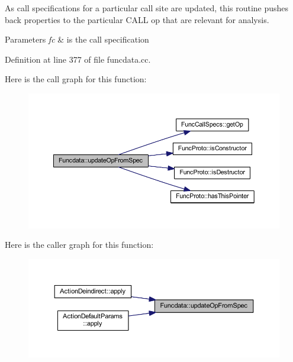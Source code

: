 As call specifications for a particular call site are updated, this routine pushes back properties to the particular C\+A\+LL op that are relevant for analysis. 
\begin{DoxyParams}{Parameters}
{\em fc} & is the call specification \\
\hline
\end{DoxyParams}


Definition at line 377 of file funcdata.\+cc.

Here is the call graph for this function\+:
\nopagebreak
\begin{figure}[H]
\begin{center}
\leavevmode
\includegraphics[width=350pt]{class_funcdata_ae4bea7abaa0ea3ade9d04cb78a521aac_cgraph}
\end{center}
\end{figure}
Here is the caller graph for this function\+:
\nopagebreak
\begin{figure}[H]
\begin{center}
\leavevmode
\includegraphics[width=350pt]{class_funcdata_ae4bea7abaa0ea3ade9d04cb78a521aac_icgraph}
\end{center}
\end{figure}
\mbox{\label{class_funcdata_a19698f34a432f84d8cbe94f8e0ad20d4}} 
